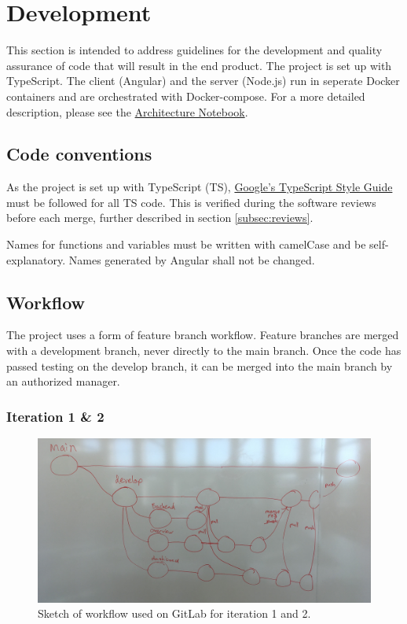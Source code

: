 \section{Development}
This section is intended to address guidelines for the development and quality assurance of code that will result in the end product. The project is set up with TypeScript. The client (Angular) and the server (Node.js) run in seperate Docker containers and are orchestrated with Docker-compose. For a more detailed description, please see the \href{https://gitlab.liu.se/tddc88-company-1-2021/deploy/-/blob/develop/documents/Architecture\%20Notebook/Architecture_Notebook.pdf}{Architecture Notebook}.

\subsection{Code conventions}
As the project is set up with TypeScript (TS), \href{https://google.github.io/styleguide/tsguide.html}{Google's TypeScript Style Guide} must be followed for all TS code. This is verified during the software reviews before each merge, further described in section \ref{subsec:reviews}.

Names for functions and variables must be written with camelCase and be self-explanatory. Names generated by Angular shall not be changed.

\subsection{Workflow}
The project uses a form of feature branch workflow. Feature branches are merged with a development branch, never directly to the main branch. Once the code has passed testing on the develop branch, it can be merged into the main branch by an authorized manager.

\subsubsection*{Iteration 1 \& 2}

\begin{figure}[H]
    \centering\includegraphics[width=1\linewidth]{figures/workflow-sketch.jpg}
    \caption{Sketch of workflow used on GitLab for iteration 1 and 2.}
    \label{fig:workflow}
\end{figure}

